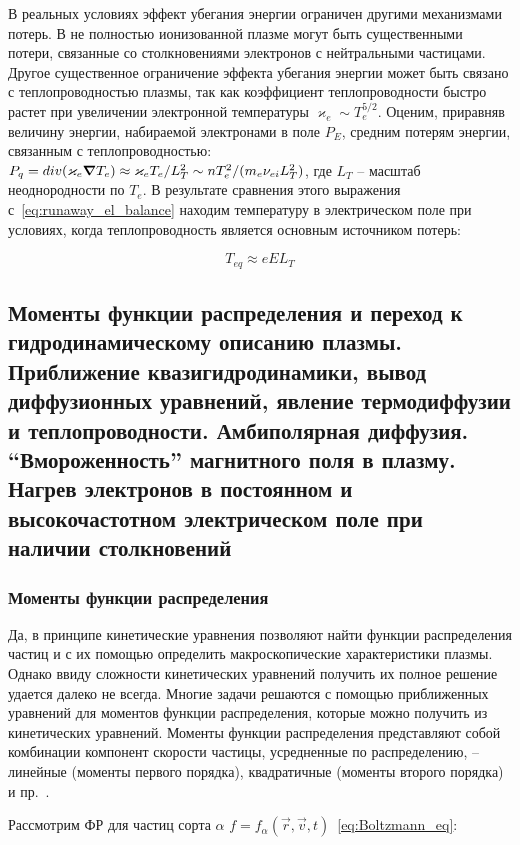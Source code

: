 \documentclass[10pt, a4paper]{article}
\begin{document}
В реальных условиях эффект убегания энергии ограничен другими механизмами потерь. В не полностью ионизованной плазме могут быть существенными потери, связанные со столкновениями электронов с нейтральными частицами. Другое существенное ограничение эффекта убегания энергии может быть связано с теплопроводностью плазмы, так как коэффициент теплопроводности быстро растет при увеличении электронной температуры $\varkappa_e\sim T_e^{5/2}$. Оценим, приравняв величину энергии, набираемой электронами в поле $P_E$, средним потерям энергии, связанным с теплопроводностью: $P_q = div(\varkappa_e\grad{T_e})\approx\varkappa_eT_e/L_T^2\sim nT_e^2/(m_e\nu_{ei}L_T^2)$, где $L_T$ -- масштаб неоднородности по $T_e$. В результате сравнения этого выражения с~\eqref{eq:runaway_el_balance} находим температуру в электрическом поле при условиях, когда теплопроводность является основным источником потерь:

\begin{equation*}
	T_{eq}\approx eEL_T
\end{equation*}

\subsection{Моменты функции распределения и переход к гидродинамическому описанию плазмы. Приближение квазигидродинамики, вывод диффузионных уравнений, явление термодиффузии и теплопроводности. Амбиполярная диффузия. ``Вмороженность'' магнитного поля в плазму. Нагрев электронов в постоянном и высокочастотном электрическом поле при наличии столкновений}

\subsubsection{Моменты функции распределения}

Да, в принципе кинетические уравнения позволяют найти функции распределения частиц и с их помощью определить макроскопические характеристики плазмы. Однако ввиду сложности кинетических уравнений получить их полное решение удается далеко не всегда. Многие задачи решаются с помощью приближенных уравнений для моментов функции распределения, которые можно получить из кинетических уравнений. Моменты функции распределения представляют собой комбинации компонент скорости частицы, усредненные по распределению, -- линейные (моменты первого порядка), квадратичные (моменты второго порядка) и пр.~\cite{golant}.

Рассмотрим ФР для частиц сорта $\alpha$ $f=f_\alpha(\vec{r}, \vec{v}, t)$~\eqref{eq:Boltzmann_eq}:
\end{document}

